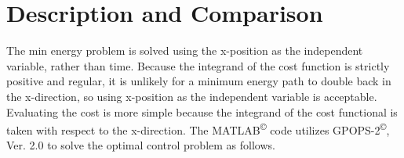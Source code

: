 %
%
%
%
%











\AddToShipoutPicture{\BackgroundStructure} %


\section*{Description and Comparison}

The min energy problem is solved using the x-position as the independent variable, rather than time. Because the integrand of the cost function is strictly positive and regular, it is unlikely for a minimum energy path to double back in the x-direction, so using x-position as the independent variable is acceptable. Evaluating the cost is more simple because the integrand of the cost functional is taken with respect to the x-direction. The MATLAB\textsuperscript{\copyright} code utilizes GPOPS-2\textsuperscript{\copyright}, Ver. 2.0 to solve the optimal control problem as follows.

